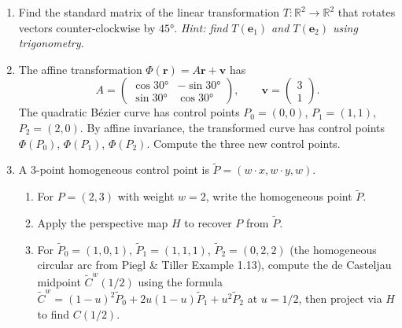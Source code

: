 \begin{enumerate}
\begin{enumerate}
  \item $A = \begin{pmatrix} 0 & -1 \\ 1 & 0 \end{pmatrix}$

  \item $A = \begin{pmatrix} 1 & 0 \\ 0 & -1 \end{pmatrix}$
\end{enumerate}

\item Find the standard matrix of the linear transformation $T : \mathbb{R}^2 \to \mathbb{R}^2$
that rotates vectors counter-clockwise by $45°$.
\emph{Hint: find $T(\mathbf{e}_1)$ and $T(\mathbf{e}_2)$ using trigonometry.}

\item The affine transformation $\Phi(\mathbf{r}) = A\mathbf{r} + \mathbf{v}$ has
\[
  A = \begin{pmatrix} \cos 30° & -\sin 30° \\ \sin 30° & \cos 30° \end{pmatrix},
  \qquad
  \mathbf{v} = \begin{pmatrix} 3 \\ 1 \end{pmatrix}.
\]
The quadratic Bézier curve has control points $P_0 = (0,0)$, $P_1 = (1,1)$, $P_2 = (2,0)$.
By affine invariance, the transformed curve has control points
$\Phi(P_0)$, $\Phi(P_1)$, $\Phi(P_2)$.
Compute the three new control points.

\item A $3$-point homogeneous control point is $\tilde{P} = (w \cdot x, w \cdot y, w)$.
\begin{enumerate}
  \item For $P = (2, 3)$ with weight $w = 2$, write the homogeneous point $\tilde{P}$.
  \item Apply the perspective map $H$ to recover $P$ from $\tilde{P}$.
  \item For $\tilde{P}_0 = (1,0,1)$, $\tilde{P}_1 = (1,1,1)$, $\tilde{P}_2 = (0,2,2)$
        (the homogeneous circular arc from Piegl \& Tiller Example 1.13),
        compute the de Casteljau midpoint
        $\tilde{C}^w(1/2)$ using the formula
        $\tilde{C}^w = (1-u)^2\tilde{P}_0 + 2u(1-u)\tilde{P}_1 + u^2\tilde{P}_2$
        at $u = 1/2$, then project via $H$ to find $C(1/2)$.
\end{enumerate}

\end{enumerate}

